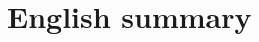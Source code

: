 \renewcommand{\thesection}{\arabic{section}}    %

\renewcommand{\bibname}{References}
\renewcommand\evenpagerightmark{{\scshape\small English summary}}
\renewcommand\oddpageleftmark{{\scshape\small English summary}}

\chapter[English summary]%
{English summary}

\hyphenation{}
\def\hyph{-\penalty0\hskip0pt\relax}

\clearpage{\pagestyle{empty}\cleardoublepage}

\renewcommand*{\thesection}{\thechapter.\arabic{section}}       %


